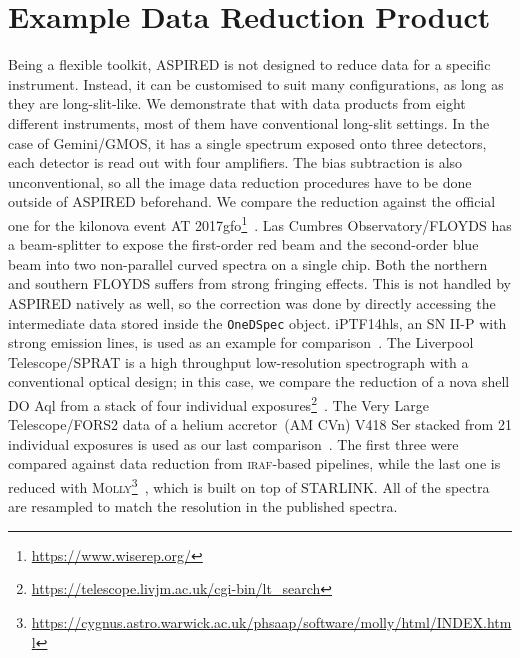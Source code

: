 \documentclass[linenumbers, twocolumn]{aastex631}
\begin{document}
\section{Example Data Reduction Product}
\label{sec:examples}
Being a flexible toolkit, \textsc{ASPIRED} is not designed to reduce data for a
specific instrument. Instead, it can be customised to suit many configurations,
as long as they are long-slit-like. We demonstrate that with data products
from eight different instruments, most of them have conventional long-slit
settings. In the case of Gemini/GMOS, it has a single spectrum exposed onto
three detectors, each detector is read out with four amplifiers. The bias 
subtraction is also unconventional, so all the image data reduction procedures
have to be done outside of ASPIRED beforehand. We compare the reduction against
the official one for the kilonova event AT 2017gfo\footnote{\url{https://www.wiserep.org/}}~\citep{2017ApJ...848L..32M}. Las Cumbres
Observatory/FLOYDS has a beam-splitter to expose
the first-order red beam and the second-order blue beam into two non-parallel
curved spectra on a single chip. Both the northern and southern FLOYDS suffers
from strong fringing effects. This is not handled by ASPIRED natively as well,
so the correction was done by directly accessing the intermediate data stored
inside the \texttt{OneDSpec} object. iPTF14hls, an SN II-P with strong emission
lines, is used as an example for comparison~\citep{2017Natur.551..210A}. The
Liverpool Telescope/SPRAT is a high throughput low-resolution spectrograph with
a conventional optical design; in this case, we compare the reduction of a nova 
shell DO Aql from a stack of four individual 
exposures\footnote{\url{https://telescope.livjm.ac.uk/cgi-bin/lt_search}}~\citep{2020MNRAS.499.2959H}. The Very Large Telescope/FORS2 data
of a helium accretor~(AM CVn) V418 Ser stacked from 21 individual exposures is
used as our last comparison~\citep{2020MNRAS.496.1243G}. The first three were 
compared against data reduction from \textsc{iraf}-based pipelines, while the
last one is reduced with \textsc{Molly}\footnote{
\url{https://cygnus.astro.warwick.ac.uk/phsaap/software/molly/html/INDEX.html}}~\citep{2019ascl.soft07012M},
which is built on top of STARLINK. All of the spectra are resampled to match
the resolution in the published spectra.
\end{document}
